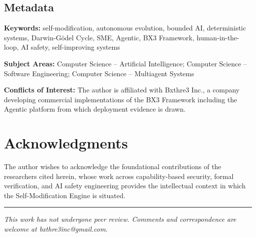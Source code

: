 \documentclass[12pt]{article}
\begin{document}
\subsection*{Metadata}

\textbf{Keywords:} self-modification, autonomous evolution, bounded AI, deterministic systems, Darwin-G\"odel Cycle, SME, Agentic, BX3 Framework, human-in-the-loop, AI safety, self-improving systems

\textbf{Subject Areas:} Computer Science -- Artificial Intelligence; Computer Science -- Software Engineering; Computer Science -- Multiagent Systems

\textbf{Conflicts of Interest:} The author is affiliated with Bxthre3 Inc., a company developing commercial implementations of the BX3 Framework including the Agentic platform from which deployment evidence is drawn.

\section*{Acknowledgments}

The author wishes to acknowledge the foundational contributions of the researchers cited herein, whose work across capability-based security, formal verification, and AI safety engineering provides the intellectual context in which the Self-Modification Engine is situated.




\vspace{2em}
\hrule
\vspace{0.5em}
\noindent\small\textit{This work has not undergone peer review. Comments and correspondence are welcome at bxthre3inc@gmail.com.}
\end{document}
